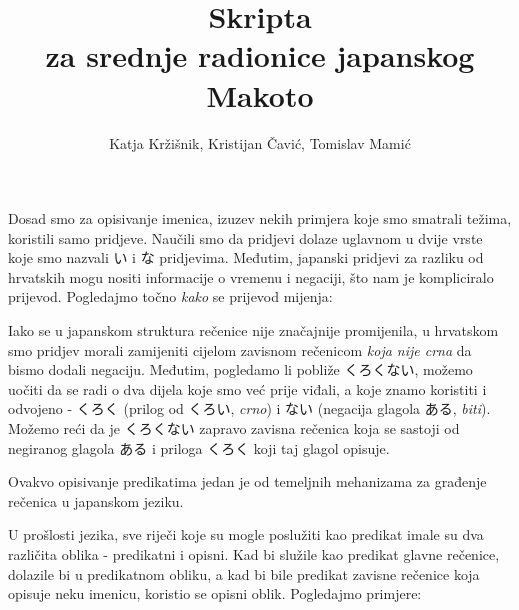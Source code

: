 
\usepackage{tikz}
\title{Skripta\\
\large za srednje radionice japanskog\\
Makoto}
\author{Katja Kržišnik, Kristijan Čavić, Tomislav Mamić}



{\let\cleardoublepage\clearpage
\maketitle
\tableofcontents}
\newpage
{}

	
	
	Dosad smo za opisivanje imenica, izuzev nekih primjera koje smo smatrali težima, koristili samo pridjeve. Naučili smo da pridjevi dolaze uglavnom u dvije vrste koje smo nazvali い i な pridjevima\footnotemark[1]. Međutim, japanski pridjevi za razliku od hrvatskih mogu nositi informacije o vremenu i negaciji, što nam je kompliciralo prijevod. Pogledajmo točno \textit{kako} se prijevod mijenja:
	
	\begin{reibun}
	\end{reibun}
	
	Iako se u japanskom struktura rečenice nije značajnije promijenila, u hrvatskom smo pridjev morali zamijeniti cijelom zavisnom rečenicom \textit{koja nije crna} da bismo dodali negaciju. Međutim, pogledamo li pobliže くろくない, možemo uočiti da se radi o dva dijela koje smo već prije viđali, a koje znamo koristiti i odvojeno - くろく (prilog od くろい, \textit{crno}) i ない (negacija glagola ある, \textit{biti}). Možemo reći da je くろくない zapravo zavisna rečenica koja se sastoji od negiranog glagola ある i priloga くろく koji taj glagol opisuje.
	
	Ovakvo opisivanje predikatima jedan je od temeljnih mehanizama za građenje rečenica u japanskom jeziku.
	
	
	
	U prošlosti jezika, sve riječi koje su mogle poslužiti kao predikat imale su dva različita oblika - predikatni i opisni\footnotemark[2]. Kad bi služile kao predikat glavne rečenice, dolazile bi u predikatnom obliku, a kad bi bile predikat zavisne rečenice koja opisuje neku imenicu, koristio se opisni oblik. Pogledajmo primjere:

